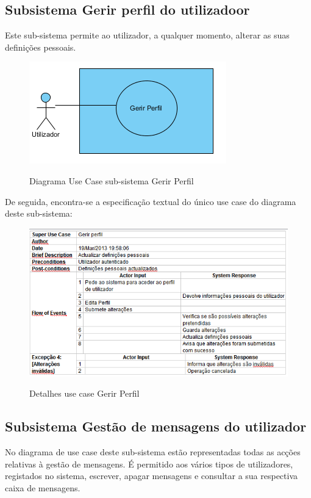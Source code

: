 \documentclass[12pt,a4paper]{article}
\begin{document}
\clearpage
\subsection{Subsistema Gerir perfil do utilizadoor}
Este sub-sistema permite ao utilizador, a qualquer momento, alterar as suas definições pessoais.\\

\begin{figure}[h!]
\centering
\includegraphics[scale=1]{usecase/U_GerirPerfil}
\label{usecase}
\caption{Diagrama Use Case sub-sistema Gerir Perfil}
\end{figure}

De seguida, encontra-se a especificação textual do único use case do diagrama deste sub-sistema:\\

\begin{figure}[h!]
\centering
\includegraphics[scale=0.7]{d_usecase/gerirperfil}
\label{usecase}
\caption{Detalhes use case Gerir Perfil}
\end{figure}

\newpage
\subsection{Subsistema Gestão de mensagens do utilizador}
No diagrama de use case deste sub-sistema estão representadas todas as acções relativas à gestão de mensagens. É permitido aos vários tipos de utilizadores, registados no sistema, escrever, apagar mensagens e consultar a sua respectiva caixa de mensagens.\\
\end{document}
